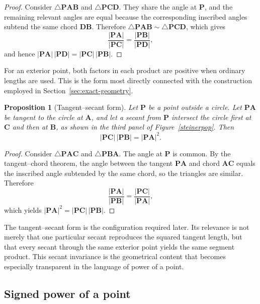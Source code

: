 \documentclass[preprint,12pt,3p,nopreprintline]{elsarticle}
\newcommand{\pt}[1]{\mathbf{#1}}
\newcommand{\seg}[1]{\mathbf{#1}}
\newcommand{\seglen}[1]{\lvert\mathbf{#1}\rvert}
\newcommand{\be}{\begin{equation}}
\newcommand{\ee}{\end{equation}}
\numberwithin{equation}{section}
\newtheorem{proposition}{Proposition}[section]
\theoremstyle{remark}
\begin{document}
\begin{proof}
Consider $\triangle \mathbf{PAB}$ and $\triangle \mathbf{PCD}$. They share the angle at $\pt{P}$, and the remaining relevant angles are equal because the corresponding inscribed angles subtend the same chord $\seg{DB}$. Therefore $\triangle \mathbf{PAB}\sim\triangle \mathbf{PCD}$, which gives
\be
\frac{\seglen{PA}}{\seglen{PC}}=\frac{\seglen{PB}}{\seglen{PD}},
\ee
and hence $\seglen{PA}\,\seglen{PD}=\seglen{PC}\,\seglen{PB}$.
\end{proof}

For an exterior point, both factors in each product are positive when ordinary lengths are used. This is the form most directly connected with the construction employed in Section~\ref{sec:exact-geometry}.

\begin{proposition}[Tangent--secant form]
\label{popsectan}
Let $\pt{P}$ be a point outside a circle. Let $\seg{PA}$ be tangent to the circle at $\pt{A}$, and let a secant from $\pt{P}$ intersect the circle first at $\pt{C}$ and then at $\pt{B}$, as shown in the third panel of Figure~\ref{steinerpop}. Then
\be
\seglen{PC}\,\seglen{PB}=\seglen{PA}^{2}.
\ee
\end{proposition}

\begin{proof}
Consider $\triangle \mathbf{PAC}$ and $\triangle \mathbf{PBA}$. The angle at $\pt{P}$ is common. By the tangent--chord theorem, the angle between the tangent $\seg{PA}$ and chord $\seg{AC}$ equals the inscribed angle subtended by the same chord, so the triangles are similar. Therefore
\be
\frac{\seglen{PA}}{\seglen{PB}}=\frac{\seglen{PC}}{\seglen{PA}},
\ee
which yields $\seglen{PA}^{2}=\seglen{PC}\,\seglen{PB}$.
\end{proof}

The tangent--secant form is the configuration required later. Its relevance is not merely that one particular secant reproduces the squared tangent length, but that every secant through the same exterior point yields the same segment product. This secant invariance is the geometrical content that becomes especially transparent in the language of power of a point.

\subsection{Signed power of a point}
\end{document}

